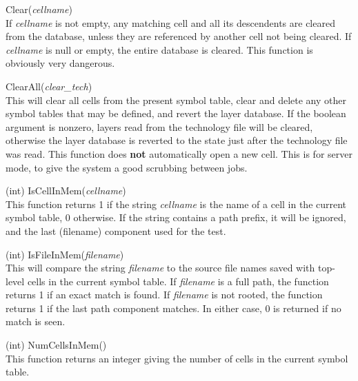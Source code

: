 \begin{description}
\item{\vt Clear({\it cellname\/})}\\
If {\it cellname} is not empty, any matching cell and all its
descendents are cleared from the database, unless they are referenced
by another cell not being cleared.  If {\it cellname} is null or
empty, the entire database is cleared.  This function is obviously
very dangerous.

\item{\vt ClearAll({\it clear\_tech\/})}\\
This will clear all cells from the present symbol table, clear and
delete any other symbol tables that may be defined, and revert the
layer database.  If the boolean argument is nonzero, layers read from
the technology file will be cleared, otherwise the layer database is
reverted to the state just after the technology file was read.  This
function does {\bf not} automatically open a new cell.  This is for
server mode, to give the system a good scrubbing between jobs.

\item{(int) \vt IsCellInMem({\it cellname\/})}\\
This function returns 1 if the string {\it cellname} is the name of a
cell in the current symbol table, 0 otherwise.  If the string contains
a path prefix, it will be ignored, and the last (filename) component
used for the test.

\item{(int) \vt IsFileInMem({\it filename\/})}\\
This will compare the string {\it filename} to the source file names
saved with top-level cells in the current symbol table.  If {\it
filename} is a full path, the function returns 1 if an exact match is
found.  If {\it filename} is not rooted, the function returns 1 if the
last path component matches.  In either case, 0 is returned if no
match is seen.

\item{(int) \vt NumCellsInMem()}\\
This function returns an integer giving the number of cells in the
current symbol table.


\end{description}
